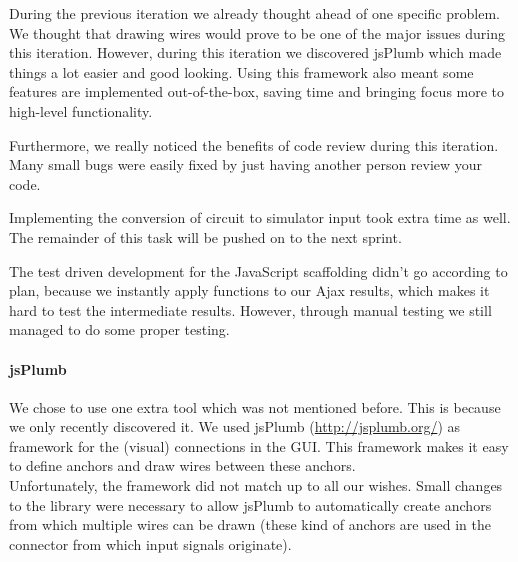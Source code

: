 \documentclass[a4paper]{article}
\begin{document}
During the previous iteration we already thought ahead of one specific problem. We thought that drawing wires would prove to be one of the major issues during this iteration. However, during this iteration we discovered jsPlumb which made things a lot easier and good looking. Using this framework also meant some features are implemented out-of-the-box, saving time and bringing focus  more to high-level functionality.

Furthermore, we really noticed the benefits of code review during this iteration. Many small bugs were easily fixed by just having another person review your code.

Implementing the conversion of circuit to simulator input took extra time as well. The remainder of this task will be pushed on to the next sprint.

The test driven development for the JavaScript scaffolding didn't go according to plan, because we instantly apply functions to our Ajax results, which makes it hard to test the intermediate results. However, through manual testing we still managed to do some proper testing.


\label{jsPlumb}\paragraph{jsPlumb}
We chose to use one extra tool which was not mentioned before. This is because we only recently discovered it. We used jsPlumb (\url{http://jsplumb.org/}) as framework for the (visual) connections in the GUI. This framework makes it easy to define anchors and draw wires between these anchors. \\
Unfortunately, the framework did not match up to all our wishes. Small changes to the library were necessary to allow jsPlumb to automatically create anchors from which multiple wires can be drawn (these kind of anchors are used in the connector from which input signals originate).
\end{document}
